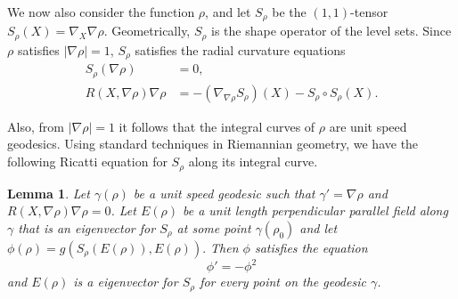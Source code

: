 \documentclass{amsart}
\theoremstyle{plain}
\newtheorem{lemma}[theorem]{\bf Lemma}
\numberwithin{equation}{section}
\begin{document}
We now also consider the function $\rho$, and let $S_{\rho}$ be the $(1,1)$-tensor $S_{\rho}(X) = \nabla_{X} \nabla \rho$. Geometrically, $S_{\rho}$ is the shape operator of the level sets.   Since $\rho$ satisfies $|\nabla \rho | = 1$, $S_{\rho}$ satisfies the radial curvature equations
\begin{align*}
S_{\rho}( \nabla \rho) & = 0, \\
R(X, \nabla \rho) \nabla \rho &= - \left( \nabla_{\nabla \rho} S_{\rho}\right)(X) - S_{\rho} \circ S_{\rho}(X).
\end{align*}

Also, from $|\nabla \rho|=1$ it follows that the integral curves of $\rho$ are unit speed geodesics. Using standard techniques in Riemannian geometry, we have the following Ricatti equation for $S_{\rho}$ along its integral curve. 

\begin{lemma} \label{lem-ricatti}
Let $\gamma(\rho)$ be a unit speed geodesic such that $\gamma' = \nabla \rho$ and $R(X, \nabla \rho) \nabla \rho = 0$.  Let $E(\rho)$ be a unit length perpendicular parallel field along $\gamma$  that is an eigenvector for $S_{\rho}$ at some point $\gamma(\rho_0)$ and let $\phi(\rho)= g(S_{\rho}(E(\rho)), E(\rho)).$  Then $\phi$ satisfies the equation 
\[ \phi' = - \phi^2\]
and $E(\rho)$ is a eigenvector for $S_{\rho}$ for every point on the geodesic $\gamma$. 
\end{lemma}
\end{document}
